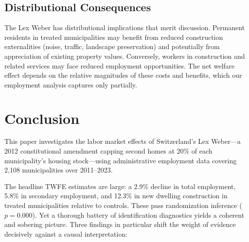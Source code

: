 \documentclass[12pt]{article}
\begin{document}
\subsection{Distributional Consequences}

The Lex Weber has distributional implications that merit discussion. Permanent residents in treated municipalities may benefit from reduced construction externalities (noise, traffic, landscape preservation) and potentially from appreciation of existing property values. Conversely, workers in construction and related services may face reduced employment opportunities. The net welfare effect depends on the relative magnitudes of these costs and benefits, which our employment analysis captures only partially.

\section{Conclusion}\label{sec:conclusion}

This paper investigates the labor market effects of Switzerland's Lex Weber---a 2012 constitutional amendment capping second homes at 20\% of each municipality's housing stock---using administrative employment data covering 2,108 municipalities over 2011--2023.

The headline TWFE estimates are large: a 2.9\% decline in total employment, 5.8\% in secondary employment, and 12.3\% in new dwelling construction in treated municipalities relative to controls. These pass randomization inference ($p = 0.000$). Yet a thorough battery of identification diagnostics yields a coherent and sobering picture. Three findings in particular shift the weight of evidence decisively against a causal interpretation:
\end{document}
